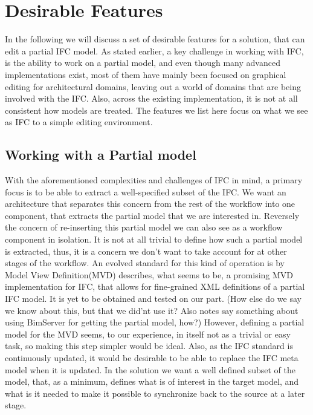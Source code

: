 \section{Desirable Features}
In the following we will discuss a set of desirable features for a solution, that can edit a partial IFC model.
As stated earlier, a key challenge in working with IFC, is the ability to work on a partial model, and even though many advanced implementations exist, most of them have mainly been focused on graphical editing for architectural domains, leaving out a world of domains that are being involved with the IFC. Also, across the existing implementation, it is not at all consistent how models are treated\cite{quteprints37725}. The features we list here focus on what we see as  IFC to a simple editing environment.

\subsection{Working with a Partial model}
With the aforementioned complexities and challenges of IFC in mind, a primary focus is to be able to extract a well-specified
subset of the IFC.  We want an architecture that separates this concern from the rest of the workflow into one component, that extracts the
partial model that we are interested in. Reversely the concern of re-inserting this partial model we can also
see as a workflow component in isolation. It is not at all trivial to define how such a partial model is extracted, thus, it is a concern we
don't want to take account for at other stages of the workflow. An evolved standard for this kind of operation is by
Model View Definition(MVD) \cite{nour08} describes, what seems to be, a promising MVD
implementation for IFC, that allows for fine-grained XML definitions of a partial IFC model. It is yet to be obtained and tested on our part.
(How else do we say we know about this, but that we did'nt use it? Also notes say something about using BimServer for getting the partial model, how?) However, defining a partial model for the MVD seems, to our experience, in itself not as a trivial or easy task, so making this step simpler would be ideal. Also, as the IFC standard is continuously updated, it would be desirable to be able to replace the IFC meta model when it is updated.
    In the solution we want a well defined subset of the model, that, as a minimum, defines what is of interest in the target model, and what is it needed
to make it possible to synchronize back to the source at a later stage.

